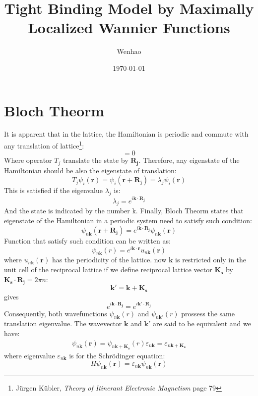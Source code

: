 \documentclass{amsart}
\begin{document}
\title{Tight Binding Model by Maximally Localized Wannier Functions}
\author{Wenhao}
\date{\today}
\maketitle

\section{Bloch Theorm}
It is apparent that in the lattice, the Hamiltonian is periodic and commute with any 
translation of lattice\footnote{ J\"{u}rgen K\"{u}bler, \emph{Theory of Itinerant Electronic Magnetism} page 79}:
\begin{equation}
    [T_j,H]=0
\end{equation}
Where operator $T_j$ translate the state by $\bm{R_j}$. Therefore, any eigenstate of the Hamiltonian should be also the eigenstate of translation:
\begin{equation}
    T_j \psi_i(\bm{r})=\psi_i(\bm{r}+\bm{R_j})=\lambda_j \psi_i(\bm{r})
\end{equation}
This is satisfied if the eigenvalue $\lambda_j$ is:
\begin{equation}
    \lambda_j=e^{i\bm{k} \cdot \bm{R_j}}
\end{equation}
And the state is indicated by the number k.
Finally, Bloch Theorm states that eigenstate of the Hamiltonian in a periodic system need to satisfy such condition:
\begin{equation}
    \psi_{n\bm{k}}(\bm{r} + \bm{R_j})=e^{i\bm{k} \cdot \bm{R_j}} \psi_{n\bm{k}}(\bm{r})
\end{equation}
Function that satisfy such condition can be written as:
\begin{equation}
    \psi_{n\bm{k}}(r)=e^{i\bm{k} \cdot \bm{r}} u_{n\bm{k}}(\bm{r})
\end{equation}
where $u_{n\bm{k}}(\bm{r})$ has the periodicity of the lattice.
now $\bm{k}$ is restricted only in the unit cell of the reciprocal lattice 
if we define reciprocal lattice vector $\bm{K_s}$ by $\bm{K_s} \cdot \bm{R_j} = 2\pi n $: 
\begin{equation}
    \bm{k'}=\bm{k}+\bm{K_s}
\end{equation}
gives
\begin{equation}
    e^{i\bm{k} \cdot \bm{R_j}} = e^{i\bm{k'} \cdot \bm{R_j}} 
\end{equation}
Consequently, both wavefunctions $\psi_{n\bm{k}}(r)$ and $\psi_{n\bm{k'}}(r)$ prossess the same translation eigenvalue. 
The wavevector $\bm{k}$ and $\bm{k'}$ are said to be equivalent and we have:
\begin{align}
    \psi_{n\bm{k}}(\bm{r}) = \psi_{n\bm{k}+\bm{K_s}}(r)
    \varepsilon_{n\bm{k}}  = \varepsilon_{n\bm{k}+\bm{K_s}}
\end{align}
where eigenvalue $\varepsilon_{n\bm{k}}$ is for the Schr\"{o}dinger equation:
\begin{equation}
    H \psi_{n\bm{k}}(\bm{r}) = \varepsilon_{n\bm{k}} \psi_{n\bm{k}}(\bm{r})
\end{equation}
\end{document}
